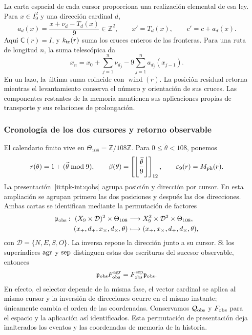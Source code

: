 La carta espacial de cada cursor proporciona una realización elemental
de esa ley. Para \(x\in I_9^2\) y una dirección cardinal \(d\),
\[
 a_d(x)=\frac{x+\nu_d-T_d(x)}9\in\mathbb Z^2,
 \qquad x'=T_d(x),\qquad c'=c+a_d(x).
\]
Aquí \(\mathsf C(r)=I\), y \(k_{\rm tr}(r)\) suma los
cruces enteros de las fronteras. Para una ruta de longitud \(n\),
la suma telescópica da
\[
 x_n=x_0+\sum_{j=1}^n\nu_{d_j}
             -9\sum_{j=1}^n a_{d_j}(x_{j-1}).
\]
En un lazo, la última suma coincide con
\(\operatorname{wind}(r)\). La posición residual retorna mientras
el levantamiento conserva el número y orientación de sus cruces.
Las componentes restantes de la memoria mantienen sus aplicaciones
propias de transporte y sus relaciones de prolongación.

\subsubsection{Cronología de los dos cursores y retorno observable}

El calendario finito vive en \(\Theta_{108}=\mathbb Z/108\mathbb Z\).
Para \(0\leq\widetilde\theta<108\), ponemos
\[
 r(\theta)=1+(\widetilde\theta\bmod9),\qquad
 \beta(\theta)=\left[\left\lfloor\frac{\widetilde\theta}{9}
 \right\rfloor\right]_{12},\qquad
 \varepsilon_9(r)=M_{\rm ph}(r).
\]
La presentación~\eqref{ii:tpk-int:qobs} agrupa posición y dirección por
cursor. En esta ampliación se agrupan primero las dos posiciones y
después las dos direcciones. Ambas cartas se identifican mediante la
permutación de factores
\begin{equation}
 \begin{aligned}
 \mathfrak p_{\rm obs}:\ (X_9\times\mathcal D)^2\times\Theta_{108}
 &\longrightarrow X_9^2\times\mathcal D^2\times\Theta_{108},\\
 (x_+,d_+,x_\times,d_\times,\theta)
 &\longmapsto(x_+,x_\times,d_+,d_\times,\theta),
 \end{aligned}
 \label{ii:ii:permutacion-coordenadas-observables}
\end{equation}
con \(\mathcal D=\{N,E,S,O\}\). La inversa repone la dirección junto
a su cursor. Si los superíndices \({\rm agr}\) y \({\rm sep}\) distinguen
estas dos escrituras del sucesor observable, entonces
\[
 \mathfrak p_{\rm obs}F_{\rm obs}^{\rm agr}
 =F_{\rm obs}^{\rm sep}\mathfrak p_{\rm obs}.
\]
En efecto, el selector depende de la misma fase, el vector cardinal se
aplica al mismo cursor y la inversión de direcciones ocurre en el mismo
instante; únicamente cambia el orden de las coordenadas. Conservamos
\(\mathcal Q_{\rm obs}\) y \(F_{\rm obs}\) para el espacio y la
aplicación así identificados. Esta permutación de presentación deja
inalterados los eventos y las coordenadas de memoria de la historia.

